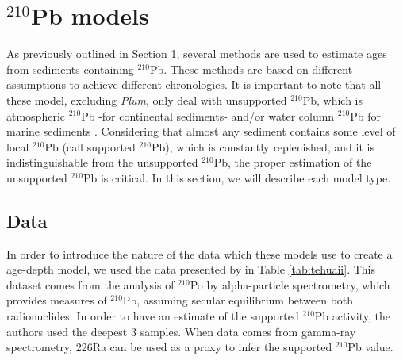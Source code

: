 \documentclass [10pt] {article}
\begin{document}

\section{$^{210}$Pb models}

	As previously outlined in Section 1, several methods are used to estimate ages from sediments containing $^{210}$Pb.  
These methods are based on different assumptions to achieve different chronologies. 
It is important to note that all these model, excluding \textit{Plum}, only deal with unsupported $^{210}$Pb, which is atmospheric $^{210}$Pb -for continental sediments- and/or water column $^{210}$Pb for marine sediments . 
Considering that almost any sediment contains some level of local $^{210}$Pb (call supported $^{210}$Pb), which is constantly replenished, and it is indistinguishable from the unsupported $^{210}$Pb, the proper estimation of the unsupported $^{210}$Pb is critical.  
In this section, we will describe each model type.

\subsection{Data}

	In order to introduce the nature of the data which these models use to create a age-depth model, we used the data presented by  \citet{Sanchez-Cabeza2012} in Table \ref{tab:tehuaii}.
This dataset comes from the analysis of $^{210}$Po by alpha-particle spectrometry, which provides measures of $^{210}$Pb, assuming secular equilibrium between both radionuclides. In order to have an estimate of the supported $^{210}$Pb activity, the authors used the deepest 3 samples. When data comes from gamma-ray spectrometry, 226Ra can be used as a proxy to infer the supported $^{210}$Pb value.  
\end{document}

